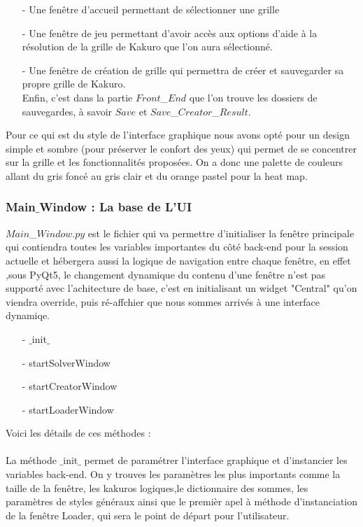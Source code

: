 \documentclass[french,12pt]{article}
\begin{document}
\begin{enumerate}
	\item[-] Une fenêtre d'accueil permettant de sélectionner une grille  \\
	\item[-] Une fenêtre de jeu permettant d'avoir accès aux options d'aide à la 				résolution de la grille de Kakuro que l'on aura sélectionné. \\
	\item[-] Une fenêtre de création de grille qui permettra de créer et sauvegarder sa 		propre grille de Kakuro. \\
	Enfin, c'est dans la partie $Front$\_$End$ que l'on trouve les dossiers de 					sauvegardes, à savoir $Save$ et $Save$\_$Creator$\_$Result$. \\
\end{enumerate}

Pour ce qui est du style de l'interface graphique nous avons opté pour un design simple et sombre (pour préserver le confort des yeux) qui permet de se concentrer sur la grille et les fonctionnalités proposées. On a donc une palette de couleurs allant du gris foncé au gris clair et du orange pastel pour la heat map.
\newpage
\subsubsection{Main$\_$Window : La base de L'UI}

$Main$\_$Window.py$ est le fichier qui va permettre d'initialiser la fenêtre principale qui contiendra toutes les variables importantes du côté back-end pour la session actuelle et hébergera aussi la logique de navigation entre chaque fenêtre, en effet ,sous PyQt5, le changement dynamique du contenu d'une fenêtre n'est pas supporté avec l'achitecture de base, c'est en initialisant un widget "Central" qu'on viendra override, puis ré-affchier que nous sommes arrivés à une interface dynamiqe. \\
\begin{enumerate}
	\item[-] $\_$init$\_$ 
	\item[-] startSolverWindow  
	\item[-] startCreatorWindow 
	\item[-] startLoaderWindow \\
\end{enumerate}
Voici les détails de ces méthodes : \\ \\
La méthode $\_$init$\_$ permet de paramétrer l'interface graphique et d'instancier les variables back-end. On y trouves les paramètres les plus importants comme la taille de la fenêtre, les kakuros logiques,le dictionnaire des sommes, les paramètres de styles généraux ainsi que le premièr apel à méthode d'instanciation de la fenêtre Loader, qui sera le point de départ pour l'utilisateur. \\ \\
\end{document}
